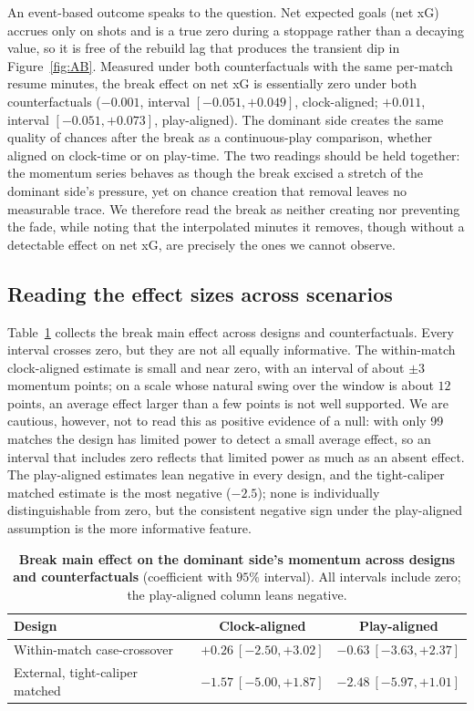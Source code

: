 \documentclass[11pt]{article}
\begin{document}
An event-based outcome speaks to the question. Net expected goals (net xG) accrues only on shots and is a true zero during a
stoppage rather than a decaying value, so it is free of the rebuild lag that produces the transient dip in
Figure~\ref{fig:AB}. Measured under both counterfactuals with the same per-match resume minutes, the
break effect on net xG is essentially zero under both counterfactuals ($-0.001$, interval $[-0.051,+0.049]$,
clock-aligned; $+0.011$, interval $[-0.051,+0.073]$, play-aligned). The dominant side creates the same quality of
chances after the break as a continuous-play comparison, whether aligned on clock-time or on play-time. The two
readings should be held together: the momentum series behaves as though the break excised a stretch of the
dominant side's pressure, yet on chance creation that removal leaves no measurable trace. We therefore read the
break as neither creating nor preventing the fade, while noting that the interpolated minutes it removes, though
without a detectable effect on net xG, are precisely the ones we cannot observe.

\subsection{Reading the effect sizes across scenarios}

Table~\ref{tab:summary} collects the break main effect across designs and counterfactuals. Every interval
crosses zero, but they are not all equally informative. The within-match clock-aligned estimate is small and
near zero, with an interval of about $\pm 3$ momentum points; on a scale whose natural swing over the window is
about $12$ points, an average effect larger than a few points is not well supported. We are cautious, however,
not to read this as positive evidence of a null: with only 99 matches the design has limited power to detect a
small average effect, so an interval that includes zero reflects that limited power as much as an absent effect. The
play-aligned estimates lean negative in every design, and the tight-caliper matched estimate is the most
negative ($-2.5$); none is individually distinguishable from zero, but the consistent negative sign under the
play-aligned assumption is the more informative feature.

\begin{table}[t]
\centering\small
\caption{\textbf{Break main effect on the dominant side's momentum across designs and counterfactuals}
(coefficient with $95\%$ interval). All intervals include zero; the play-aligned column leans negative.}
\label{tab:summary}
\begin{tabular}{lcc}
\toprule
Design & Clock-aligned & Play-aligned \\
\midrule
Within-match case-crossover        & $+0.26\ [-2.50,+3.02]$ & $-0.63\ [-3.63,+2.37]$ \\
External, tight-caliper matched     & $-1.57\ [-5.00,+1.87]$ & $-2.48\ [-5.97,+1.01]$ \\
\bottomrule
\end{tabular}
\end{table}
\end{document}
